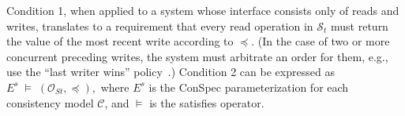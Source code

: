 \documentclass[journal,compsoc]{IEEEtran}
\begin{document}
Condition 1, when applied to a system whose interface consists only of reads and writes, translates to a requirement that every read operation in $\mathcal{S}_t$ must return the value of the most recent write according to $\preccurlyeq$. (In the case of two or more concurrent preceding writes, the system must arbitrate an order for them, e.g., use the ``last writer wins'' policy~\cite{lww}.)
  Condition 2 can be expressed as $ E^s\; \vDash \; \left( {\mathcal{O}_{St}}, \preccurlyeq \right),$ where %
  $E^s$ is the ConSpec parameterization for each
 consistency model $\mathcal{C}$,
 and  $\vDash$ is the satisfies operator.


\end{document}
